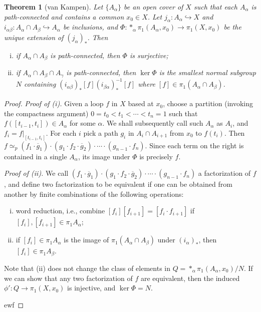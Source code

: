 \documentclass[11pt]{article}
\theoremstyle{definition}
\theoremstyle{plain}
\newtheorem{theorem}{Theorem}[section]
\theoremstyle{remark}
\begin{document}
\begin{theorem}[van Kampen]
Let $\{A_\alpha\}$ be an open cover of $X$ such that each $A_\alpha$ is path-connected and contains a common $x_0\in X$. Let $j_\alpha:A_\alpha\hookrightarrow X$ and $i_{\alpha\beta}:A_\alpha\cap A_\beta\hookrightarrow A_\alpha$ be inclusions, and $\Phi:\ast_\alpha\pi_1(A_\alpha,x_0)\to\pi_1(X,x_0)$ be the unique extension of $(j_\alpha)_\ast$. Then\begin{enumerate}[(i)]
    \item if $A_\alpha\cap A_\beta$ is path-connected, then $\Phi$ is surjective;
    \item if $A_\alpha\cap A_\beta\cap A_\gamma$ is path-connected, then $\ker\Phi$ is the smallest normal subgroup $N$ containing $(i_{\alpha\beta})_\ast[f](i_{\beta\alpha})_\ast^{-1}[f]$ where $[f]\in\pi_1(A_\alpha\cap A_\beta)$.
\end{enumerate}
\end{theorem}
\begin{proof}
\textit{Proof of (i).} Given a loop $f$ in $X$ based at $x_0$, choose a partition (invoking the compactness argument) $0=t_0<t_1<\cdots<t_n=1$ such that $f([t_{i-1},t_i])\in A_\alpha$ for some $\alpha$. We shall subsequently call such $A_\alpha$ as $A_i$, and $f_i=f|_{[t_{i-1},t_i]}$. For each $i$ pick a path $g_i$ in $A_i\cap A_{i+1}$ from $x_0$ to $f(t_i)$. Then $f\simeq_p(f_1\cdot\overline{g}_1)\cdot(g_1\cdot f_2\cdot\overline{g}_2)\cdot\cdots\cdot(g_{n-1}\cdot f_n)$. Since each term on the right is contained in a single $A_\alpha$, its image under $\Phi$ is precisely $f$.\medbreak

\textit{Proof of (ii).} We call $(f_1\cdot\overline{g}_1)\cdot(g_1\cdot f_2\cdot\overline{g}_2)\cdot\cdots\cdot(g_{n-1}\cdot f_n)$ a factorization of $f$, and define two factorization to be equivalent if one can be obtained from another by finite combinations of the following operations:\begin{enumerate}[(i)]
    \item word reduction, i.e., combine $[f_i][f_{i+1}]=[f_i\cdot f_{i+1}]$ if $[f_i],[f_{i+1}]\in\pi_1A_\alpha$;
    \item if $[f_i]\in\pi_1A_\alpha$ is the image of $\pi_1(A_\alpha\cap A_\beta)$ under $(i_\alpha)_\ast$, then $[f_i]\in\pi_1A_\beta$.
\end{enumerate}
Note that (ii) does not change the class of elements in $Q=\ast_\alpha\pi_1(A_\alpha,x_0)/N$. If we can show that any two factorization of $f$ are equivalent, then the induced $\phi':Q\to\pi_1(X,x_0)$ is injective, and $\ker\Phi=N$.\medbreak

ewf
\end{proof}
\end{document}
